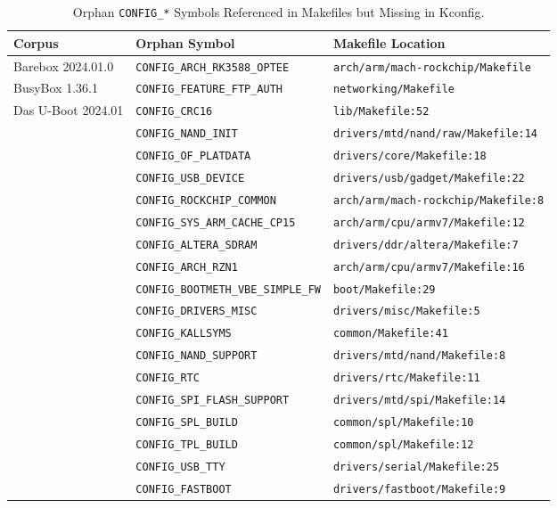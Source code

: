 \documentclass[acmsmall,screen,review]{acmart}
\begin{document}
\begin{table}[t]
\centering
\footnotesize
\setlength{\tabcolsep}{4pt}
\caption{Orphan \texttt{CONFIG\_*} Symbols Referenced in Makefiles but Missing in Kconfig.}
\label{tab:orphan-symbols}
\begin{tabular}{lll}
\toprule
\textbf{Corpus} & \textbf{Orphan Symbol} & \textbf{Makefile Location} \\
\midrule
Barebox 2024.01.0 & \texttt{CONFIG\_ARCH\_RK3588\_OPTEE} & \texttt{arch/arm/mach-rockchip/Makefile} \\
BusyBox 1.36.1 & \texttt{CONFIG\_FEATURE\_FTP\_AUTH} & \texttt{networking/Makefile} \\
\midrule
Das U-Boot 2024.01 & \texttt{CONFIG\_CRC16} & \texttt{lib/Makefile:52} \\
& \texttt{CONFIG\_NAND\_INIT} & \texttt{drivers/mtd/nand/raw/Makefile:14} \\
& \texttt{CONFIG\_OF\_PLATDATA} & \texttt{drivers/core/Makefile:18} \\
& \texttt{CONFIG\_USB\_DEVICE} & \texttt{drivers/usb/gadget/Makefile:22} \\
& \texttt{CONFIG\_ROCKCHIP\_COMMON} & \texttt{arch/arm/mach-rockchip/Makefile:8} \\
& \texttt{CONFIG\_SYS\_ARM\_CACHE\_CP15} & \texttt{arch/arm/cpu/armv7/Makefile:12} \\
& \texttt{CONFIG\_ALTERA\_SDRAM} & \texttt{drivers/ddr/altera/Makefile:7} \\
& \texttt{CONFIG\_ARCH\_RZN1} & \texttt{arch/arm/cpu/armv7/Makefile:16} \\
& \texttt{CONFIG\_BOOTMETH\_VBE\_SIMPLE\_FW} & \texttt{boot/Makefile:29} \\
& \texttt{CONFIG\_DRIVERS\_MISC} & \texttt{drivers/misc/Makefile:5} \\
& \texttt{CONFIG\_KALLSYMS} & \texttt{common/Makefile:41} \\
& \texttt{CONFIG\_NAND\_SUPPORT} & \texttt{drivers/mtd/nand/Makefile:8} \\
& \texttt{CONFIG\_RTC} & \texttt{drivers/rtc/Makefile:11} \\
& \texttt{CONFIG\_SPI\_FLASH\_SUPPORT} & \texttt{drivers/mtd/spi/Makefile:14} \\
& \texttt{CONFIG\_SPL\_BUILD} & \texttt{common/spl/Makefile:10} \\
& \texttt{CONFIG\_TPL\_BUILD} & \texttt{common/spl/Makefile:12} \\
& \texttt{CONFIG\_USB\_TTY} & \texttt{drivers/serial/Makefile:25} \\
& \texttt{CONFIG\_FASTBOOT} & \texttt{drivers/fastboot/Makefile:9} \\
\bottomrule
\end{tabular}
\end{table}
\end{document}
